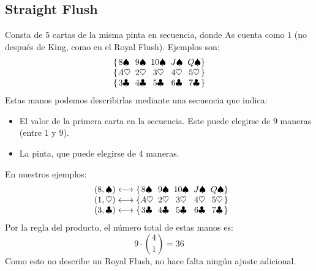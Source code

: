 \subsection{Straight Flush}
\label{sec:straight-flush}

  Consta de \(5\) cartas de la misma pinta en secuencia,
  donde \foreignlanguage{english}{As} cuenta como \(1\)
  (no después de \foreignlanguage{english}{King},
   como en el \foreignlanguage{english}{Royal Flush}).
  Ejemplos son:
  \begin{equation*}
    \begin{array}{@{\{}*{4}{c@{\;\;}}c@{\}}}
      8 \spadesuit & 9 \spadesuit & 10 \spadesuit &
	J \spadesuit & Q \spadesuit \\
      A \heartsuit & 2 \heartsuit & 3 \heartsuit  &
	4 \heartsuit & 5\heartsuit \\
      3 \clubsuit  & 4 \clubsuit  & 5 \clubsuit	  &
	6\clubsuit  & 7\clubsuit
    \end{array}
  \end{equation*}
  Estas manos podemos describirlas mediante
  una secuencia que indica:
  \begin{itemize}
  \item
    El valor de la primera carta en la secuencia.
    Este puede elegirse de \(9\) maneras
    (entre \(1\) y \(9\)).
  \item
    La pinta,
    que puede elegirse de \(4\) maneras.
  \end{itemize}
  En nuestros ejemplos:
  \begin{equation*}
    \begin{array}{l@{{} \longleftrightarrow \{}*{4}{c@{\;\;}}c@{\}}}
      (8, \spadesuit) &
	8 \spadesuit  & 9 \spadesuit & 10 \spadesuit &
	J \spadesuit  & Q \spadesuit \\
      (1, \heartsuit) &
	A \heartsuit  & 2 \heartsuit & 3 \heartsuit  &
	4 \heartsuit  & 5 \heartsuit \\
      (3, \clubsuit)  &
	3 \clubsuit   & 4 \clubsuit  & 5 \clubsuit   &
	6 \clubsuit   & 7 \clubsuit
    \end{array}
  \end{equation*}
  Por la regla del producto,%
  el número total de estas manos es:
  \begin{equation*}
    9 \cdot \binom{4}{1} = 36
  \end{equation*}
  Como esto no describe un \foreignlanguage{english}{Royal Flush},
  no hace falta ningún ajuste adicional.

